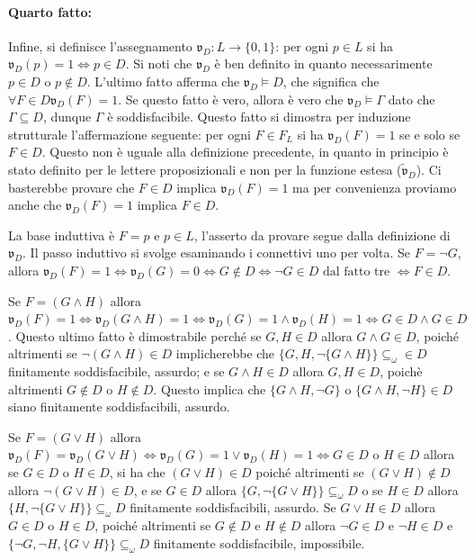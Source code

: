 \paragraph{Quarto fatto:}
Infine, si definisce l'assegnamento $\mathfrak{v}_D : L \rightarrow \{0,1\}$:
per ogni $p \in L$ si ha $\mathfrak{v}_D(p) = 1 \iff p \in D$. Si noti che 
$\mathfrak{v}_D$ è ben 
definito in quanto necessarimente $p \in D$ o $p \notin D$. L'ultimo fatto 
afferma che $\mathfrak{v}_D \models D$, che significa che $\forall F \in D \mathfrak{v}_D(F) = 1$. 
Se questo fatto è vero, allora è vero che $\mathfrak{v}_D \models \Gamma$ dato che $\Gamma \subseteq D$, 
dunque $\Gamma$ è soddisfacibile.
Questo fatto si dimostra per induzione 
strutturale l'affermazione seguente: per ogni $F \in F_L$ si ha $\mathfrak{v}_D(F) = 1$ se 
e solo se $F \in D$. Questo non è uguale alla definizione precedente, in quanto 
in principio è stato definito per le lettere proposizionali e non per la 
funzione estesa ($\tilde{\mathfrak{v}}_D$). Ci basterebbe provare che $F \in D$ 
implica $\mathfrak{v}_D(F) = 1$ ma per convenienza proviamo anche che 
$\mathfrak{v}_D(F) = 1$ implica $F \in D$. 

La base induttiva è $F = p$ e $p \in L$, l'asserto da 
provare segue dalla definizione di $\mathfrak{v}_D$. Il passo induttivo si svolge esaminando 
i connettivi uno per volta. Se $F = \neg G$, allora 
$\mathfrak{v}_D(F) = 1 \iff \mathfrak{v}_D(G) = 0 \iff G \notin D \iff \neg G \in D \text{ dal fatto tre }\iff F \in D$. 

Se $F = (G \land H)$ allora $\mathfrak{v}_D(F) = 1 \iff \mathfrak{v}_D(G \land H) = 1 \iff \mathfrak{v}_D(G) = 1 \land \mathfrak{v}_D(H) = 1\iff G \in D \land G \in D$. Questo ultimo fatto è dimostrabile perché se $G, H \in D$ allora 
$G \land G \in D$, poiché altrimenti se $\neg(G \land H) \in D$ implicherebbe 
che $\{G, H, \neg \{G \land H\}\} \subseteq_{\omega} \in D$ finitamente 
soddisfacibile, assurdo; e se $G\land H \in D $ allora $G, H \in D$, poichè altrimenti 
$G \notin D$ o $H \notin D$. Questo implica che $\{G\land H, \neg G\}$ 
o $\{G\land H, \neg H\} \in D$ siano finitamente soddisfacibili, assurdo. 
 
Se $F = (G \lor H)$ allora $\mathfrak{v}_D(F) = \mathfrak{v}_D(G \lor H) \iff \mathfrak{v}_D(G) = 1 \lor \mathfrak{v}_D(H) = 1 \iff G \in D \text{ o } H \in D$
allora se $G \in D$ o $H \in D$, si ha che $(G \lor H) \in D$ poiché altrimenti 
se $(G \lor H) \notin D$ allora $\neg (G \lor H) \in D$, e se $G \in D$ allora 
$\{G, \neg \{G \lor H \}\} \subseteq_{\omega} D$
o se $H \in D$ allora $\{H, \neg \{G \lor H\}\} \subseteq_{\omega} D$ finitamente 
soddisfacibili, assurdo. 
Se $G \lor H \in D$ allora $G \in D$ o $H \in D$, 
poiché altrimenti se $G \notin D$ e $H \notin D$ allora $\neg G \in D $ e 
$\neg H \in D$ e $\{\neg G, \neg H, \{G \lor H \}\} \subseteq_{\omega} D$ 
finitamente soddisfacibile, impossibile. 

